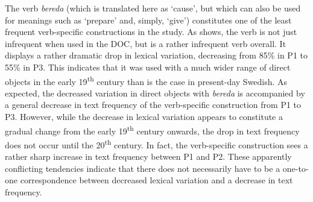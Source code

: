 \documentclass[output=paper]{langscibook}
\begin{document}
The verb \textit{bereda} (which is translated here as ‘cause’, but which can also be used for meanings such as ‘prepare’ and, simply, ‘give’) constitutes one of the least frequent verb-specific constructions in the study. As  shows, the verb is not just infrequent when used in the DOC, but is a rather infrequent verb overall. It displays a rather dramatic drop in lexical variation, decreasing from 85\% in P1 to 55\% in P3. This indicates that it was used with a much wider range of direct objects in the early 19\textsuperscript{th} century than is the case in present-day Swedish. As expected, the decreased variation in direct objects with \textit{bereda} is accompanied by a general decrease in text frequency of the verb-specific construction from P1 to P3. However, while the decrease in lexical variation appears to constitute a gradual change from the early 19\textsuperscript{th} century onwards, the drop in text frequency does not occur until the 20\textsuperscript{th} century. In fact, the verb-specific construction sees a rather sharp increase in text frequency between P1 and P2. These apparently conflicting tendencies indicate that there does not necessarily have to be a one-to-one correspondence between decreased lexical variation and a decrease in text frequency.


\begin{table}
\caption{Frequency measures of the verb-specific DOC with \textit{bereda} ‘cause’\label{tab:valdeson:8}}
\end{table}
\end{document}
